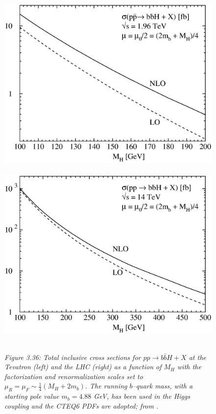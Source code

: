 \begin{figure}[h]
\begin{center}
\mbox{
\includegraphics[bb=50 250 580 600,scale=0.44]{./sm3/tev_2b_mh.ps}\hspace*{-2mm}
\includegraphics[bb=50 250 580 600,scale=0.44]{./sm3/lhc_2b_mh.ps} }
\end{center}
{\it Figure 3.36: Total inclusive cross sections for $pp \rightarrow b \bar b 
H+X$ at the Tevatron (left) and the LHC (right) as a function of $M_H$ with the
factorization and renormalization scales set to $\mu_R = \mu_F \sim \frac{1}
{4} (M_H+ 2m_b)$. The running $b$--quark mass, with a starting pole value
$m_b=4.88$ GeV,  has been used in  the Higgs coupling and the CTEQ6 PDFs
are adopted; from \cite{Hbb-NLO1}.}
\vspace*{2mm}
\end{figure}


